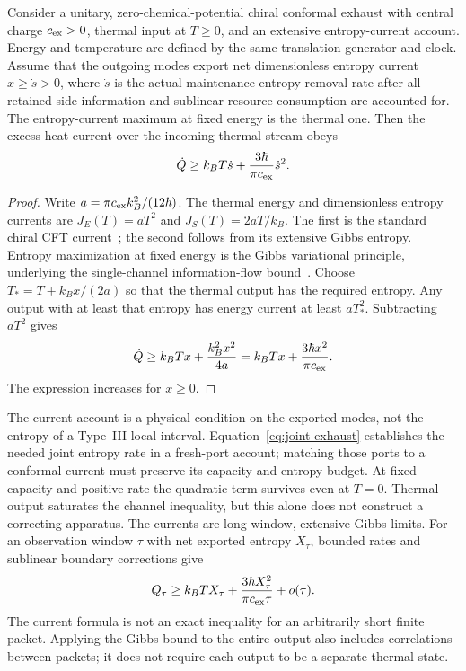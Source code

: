\begin{proposition}\label{prop:chiral-floor}
Consider a unitary, zero-chemical-potential chiral conformal exhaust with central charge
$c_{\rm ex}>0$, thermal input at $T\ge0$, and an extensive entropy-current account.
Energy and temperature are defined by the same translation generator and clock.
Assume that the outgoing modes export net dimensionless entropy current
$x\ge\dot s>0$, where $\dot s$ is the actual maintenance entropy-removal rate after
all retained side information and sublinear resource consumption are accounted for.
The entropy-current maximum at fixed energy is the thermal one. Then the excess
heat current over the incoming thermal stream obeys
\begin{equation}\label{eq:chiral-floor}
 \dot Q\ge k_BT\dot s+\frac{3\hbar}{\pi c_{\rm ex}}\dot s^2.
\end{equation}
\end{proposition}
\begin{proof}
Write $a=\pi c_{\rm ex}k_B^2/(12\hbar)$. The thermal energy and dimensionless
entropy currents are $J_E(T)=aT^2$ and $J_S(T)=2aT/k_B$.
The first is the standard chiral CFT current~\cite[Eq.~(1)]{BernardDoyon2012};
the second follows from its extensive Gibbs entropy. Entropy maximization at
fixed energy is the Gibbs variational principle, underlying the single-channel
information-flow bound~\cite{Pendry1983}.
Choose $T_*=T+k_Bx/(2a)$ so that the thermal output has the required entropy.
Any output with at least that entropy has energy current at least $aT_*^2$.
Subtracting $aT^2$ gives
\[
 \dot Q\ge k_BTx+\frac{k_B^2x^2}{4a}
            =k_BTx+\frac{3\hbar x^2}{\pi c_{\rm ex}}.
\]
The expression increases for $x\ge0$.
\end{proof}

The current account is a physical condition on the exported modes, not the entropy
of a Type~III local interval. Equation~\eqref{eq:joint-exhaust} establishes the
needed joint entropy rate in a fresh-port account; matching those ports to a conformal current
must preserve its capacity and entropy budget. At fixed capacity and positive
rate the quadratic term survives even at $T=0$. Thermal output saturates the
channel inequality, but this alone does not construct a correcting apparatus.
The currents are long-window, extensive Gibbs limits. For an observation window
$\tau$ with net exported entropy $X_\tau$, bounded rates and sublinear boundary
corrections give
\[
 Q_\tau\ge k_BT X_\tau+
 \frac{3\hbar X_\tau^2}{\pi c_{\rm ex}\tau}+o(\tau).
\]
The current formula is not an exact inequality for an arbitrarily short finite
packet. Applying the Gibbs bound to the entire output also includes correlations
between packets; it does not require each output to be a separate thermal state.

